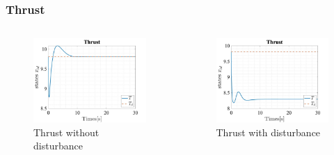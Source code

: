 \documentclass{beamer}
\begin{document}
\begin{frame}
    \frametitle{Thrust}

    \begin{columns}

        \begin{figure}[h]
            \centering
            \includegraphics[width=1\textwidth]{Thrust_T_LQR.jpg}
            \caption{Thrust without disturbance}
        \end{figure}

        \begin{figure}[h]
            \centering
            \includegraphics[width=1\textwidth]{Thrust_T_LQR_Dist.jpg}
            \caption{Thrust with disturbance}
        \end{figure}
    \end{columns}
\end{frame}
\end{document}
